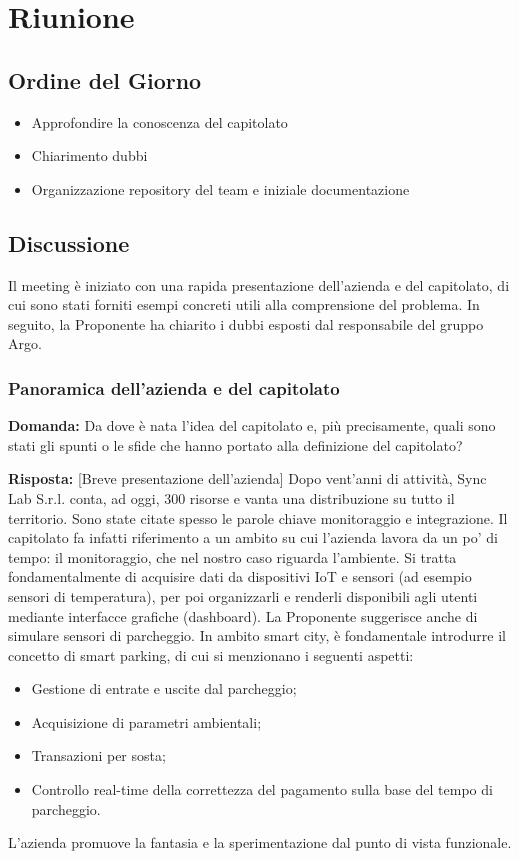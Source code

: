 \section{Riunione}
\subsection{Ordine del Giorno}
\begin{itemize}
	\item Approfondire la conoscenza del capitolato
	\item Chiarimento dubbi
	\item Organizzazione repository del team e iniziale documentazione
\end{itemize}

\subsection{Discussione}
Il meeting è iniziato con una rapida presentazione dell’azienda e del capitolato, di cui sono stati forniti esempi concreti utili alla comprensione del problema. In seguito, la Proponente ha chiarito i dubbi esposti dal responsabile del gruppo Argo.

\subsubsection{Panoramica dell’azienda e del capitolato}
\textbf{Domanda:} Da dove è nata l’idea del capitolato e, più precisamente, quali sono stati gli spunti o le sfide che hanno portato alla definizione del capitolato?

\textbf{Risposta:} [Breve presentazione dell’azienda] Dopo vent'anni di attività, Sync Lab S.r.l. conta, ad oggi, 300 risorse e vanta una distribuzione su tutto il territorio. Sono state citate spesso le parole chiave monitoraggio e integrazione. Il capitolato fa infatti riferimento a un ambito su cui l’azienda lavora da un po' di tempo: il monitoraggio, che nel nostro caso riguarda l’ambiente. Si tratta fondamentalmente di acquisire dati da dispositivi IoT e sensori (ad esempio sensori di temperatura), per poi organizzarli e renderli disponibili agli utenti mediante interfacce grafiche (dashboard).
La Proponente suggerisce anche di simulare sensori di parcheggio. In ambito smart city, è fondamentale introdurre il concetto di smart parking, di cui si menzionano i seguenti aspetti:
\begin{itemize}
	\item Gestione di entrate e uscite dal parcheggio;
	\item Acquisizione di parametri ambientali;
	\item Transazioni per sosta;
	\item Controllo real-time della correttezza del pagamento sulla base del tempo di parcheggio.
\end{itemize}
L’azienda promuove la fantasia e la sperimentazione dal punto di vista funzionale.

